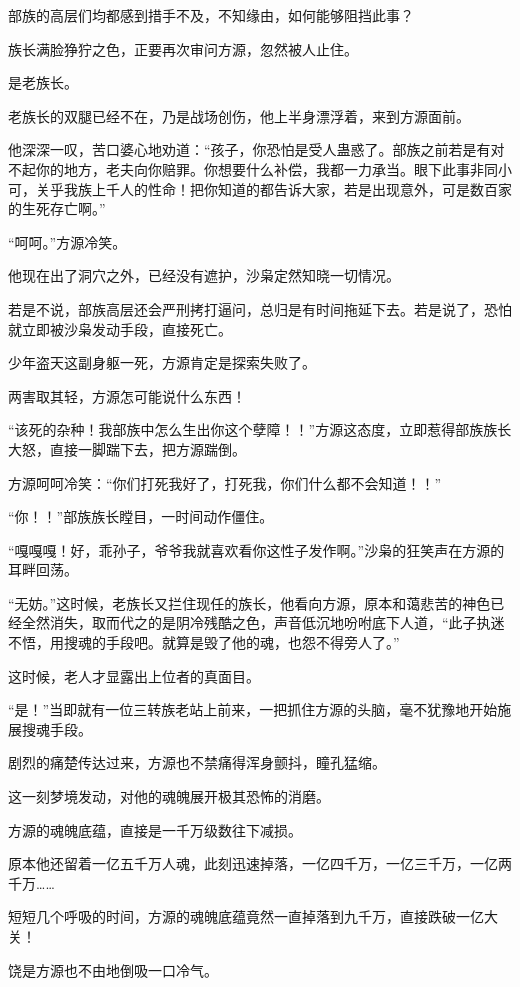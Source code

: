 \begin{this_body}
部族的高层们均都感到措手不及，不知缘由，如何能够阻挡此事？

族长满脸狰狞之色，正要再次审问方源，忽然被人止住。

是老族长。

老族长的双腿已经不在，乃是战场创伤，他上半身漂浮着，来到方源面前。

他深深一叹，苦口婆心地劝道：“孩子，你恐怕是受人蛊惑了。部族之前若是有对不起你的地方，老夫向你赔罪。你想要什么补偿，我都一力承当。眼下此事非同小可，关乎我族上千人的性命！把你知道的都告诉大家，若是出现意外，可是数百家的生死存亡啊。”

“呵呵。”方源冷笑。

他现在出了洞穴之外，已经没有遮护，沙枭定然知晓一切情况。

若是不说，部族高层还会严刑拷打逼问，总归是有时间拖延下去。若是说了，恐怕就立即被沙枭发动手段，直接死亡。

少年盗天这副身躯一死，方源肯定是探索失败了。

两害取其轻，方源怎可能说什么东西！

“该死的杂种！我部族中怎么生出你这个孽障！！”方源这态度，立即惹得部族族长大怒，直接一脚踹下去，把方源踹倒。

方源呵呵冷笑：“你们打死我好了，打死我，你们什么都不会知道！！”

“你！！”部族族长瞠目，一时间动作僵住。

“嘎嘎嘎！好，乖孙子，爷爷我就喜欢看你这性子发作啊。”沙枭的狂笑声在方源的耳畔回荡。

“无妨。”这时候，老族长又拦住现任的族长，他看向方源，原本和蔼悲苦的神色已经全然消失，取而代之的是阴冷残酷之色，声音低沉地吩咐底下人道，“此子执迷不悟，用搜魂的手段吧。就算是毁了他的魂，也怨不得旁人了。”

这时候，老人才显露出上位者的真面目。

“是！”当即就有一位三转族老站上前来，一把抓住方源的头脑，毫不犹豫地开始施展搜魂手段。

剧烈的痛楚传达过来，方源也不禁痛得浑身颤抖，瞳孔猛缩。

这一刻梦境发动，对他的魂魄展开极其恐怖的消磨。

方源的魂魄底蕴，直接是一千万级数往下减损。

原本他还留着一亿五千万人魂，此刻迅速掉落，一亿四千万，一亿三千万，一亿两千万……

短短几个呼吸的时间，方源的魂魄底蕴竟然一直掉落到九千万，直接跌破一亿大关！

饶是方源也不由地倒吸一口冷气。


\end{this_body}
